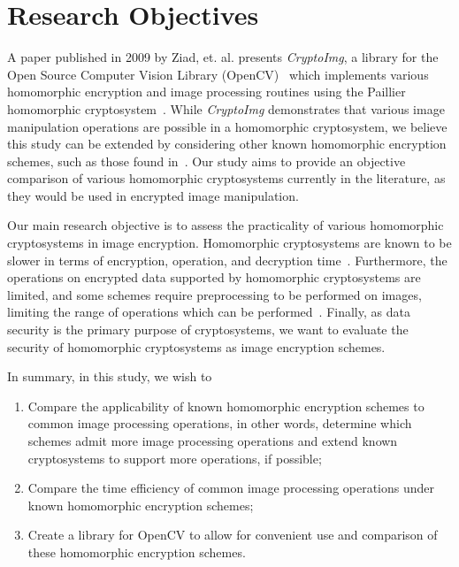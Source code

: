 \section{Research Objectives}

A paper published in 2009 by Ziad, et. al. presents \textit{CryptoImg}, a library for the  Open Source Computer Vision Library (OpenCV)~\cite{bradski_opencv_2000} which implements various homomorphic encryption and image processing routines using the Paillier homomorphic cryptosystem~\cite{ziad_cryptoimg:_2016}. While \textit{CryptoImg} demonstrates that various image manipulation operations are possible in a homomorphic cryptosystem, we believe this study can be extended by considering other known homomorphic encryption schemes, such as those found in~\cite{li_elliptic_2012, hutchison_fully_2010}. Our study aims to provide an objective comparison of various homomorphic cryptosystems currently in the literature, as they would be used in encrypted image manipulation.

Our main research objective is to assess the practicality of various homomorphic cryptosystems in image encryption. Homomorphic cryptosystems are known to be slower in terms of encryption, operation, and decryption time~\cite{sen_homomorphic_2013}. Furthermore, the operations on encrypted data supported by homomorphic cryptosystems are limited, and some schemes require preprocessing to be performed on images, limiting the range of operations which can be performed~\cite{li_elliptic_2012}. Finally, as data security is the primary purpose of cryptosystems, we want to evaluate the security of homomorphic cryptosystems as image encryption schemes.

In summary, in this study, we wish to
\begin{enumerate}
    \item Compare the applicability of known homomorphic encryption schemes to common image processing operations, in other words, determine which schemes admit more image processing operations and extend known cryptosystems to support more operations, if possible;
    \item Compare the time efficiency of common image processing operations under known homomorphic encryption schemes;
    \item Create a library for OpenCV to allow for convenient use and comparison of these homomorphic encryption schemes.
\end{enumerate}
